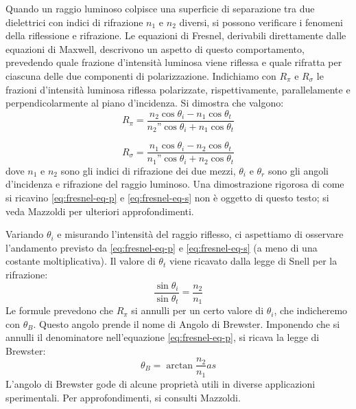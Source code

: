 Quando un raggio luminoso colpisce una superficie di separazione tra due
dielettrici con indici di rifrazione $n_1$ e $n_2$ diversi, si possono verificare
i fenomeni della riflessione e rifrazione.
Le equazioni di Fresnel, derivabili direttamente dalle equazioni di Maxwell, %
descrivono un aspetto di questo comportamento, prevedendo quale frazione d'intensità
luminosa viene riflessa e quale rifratta per ciascuna delle due componenti di
polarizzazione.
Indichiamo con $R_\pi$ e $R_\sigma$ le frazioni d'intensità luminosa riflessa
polarizzate, rispettivamente, parallelamente e perpendicolarmente al piano
d'incidenza.
Si dimostra che valgono:
%
\begin{equation}
  R_\pi = \frac {
    n_2 \cos{\theta_i} - n_1 \cos{\theta_t}
  } {
    n_2” \cos{\theta_i} + n_1 \cos{\theta_t}
  }\label{eq:fresnel-eq-p}
\end{equation}

\begin{equation}
  R_\sigma = \frac {
    n_1 \cos{\theta_i} - n_2 \cos{\theta_t}
  } {
    n_1” \cos{\theta_i} + n_2 \cos{\theta_t}
  }\label{eq:fresnel-eq-s}
\end{equation}
%
\noindent dove $n_1$ e $n_2$ sono gli indici di rifrazione dei due mezzi, $\theta_i$ e
$\theta_r$ sono gli angoli d'incidenza e rifrazione del raggio luminoso.
Una dimostrazione rigorosa di come si ricavino \eqref{eq:fresnel-eq-p} e \eqref{eq:fresnel-eq-s} non è oggetto
di questo testo;
si veda Mazzoldi\cite{mazzoldi98} per ulteriori approfondimenti.

Variando $\theta_i$ e misurando l’intensità del raggio riflesso,
ci aspettiamo di osservare l'andamento previsto da \eqref{eq:fresnel-eq-p} e \eqref{eq:fresnel-eq-s} (a meno di una
costante moltiplicativa).
Il valore di $\theta_t$ viene ricavato dalla legge di Snell per la rifrazione:
%
\begin{equation}
  \frac {\sin{\theta_i}} {\sin{\theta_t}} = \frac {n_2} {n_1}
  \label{eq:legge-snell}
\end{equation}
%
\noindent Le formule prevedono che $R_\pi$ si annulli per un certo valore di $\theta_i$,
che indicheremo con $\theta_B$.
Questo angolo prende il nome di Angolo di Brewster. Imponendo che si annulli il
denominatore nell'equazione \eqref{eq:fresnel-eq-p}, si ricava la legge di Brewster:
%
\begin{equation}
  \theta_B = \arctan{
    \frac {n_2} {n_1}as
  }\label{eq:legge-brewster}
\end{equation}
%
\noindent  L’angolo di Brewster gode di alcune proprietà utili in diverse applicazioni
sperimentali.
Per approfondimenti, si consulti Mazzoldi\cite{mazzoldi98}.
\endinput
